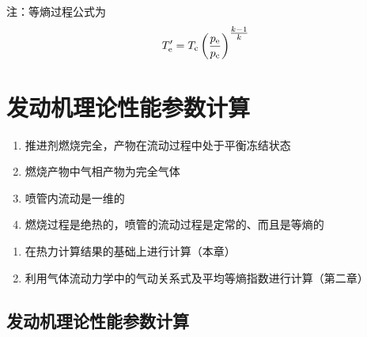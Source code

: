 注：等熵过程公式为
\begin{equation}
	T'_{\rm{e}} = T_{\text{c}} \left(\dfrac{p_{\rm{e}}}{p_{\text{c}}}\right)^{\textstyle \frac{k-1}{k}}
	\label{等熵流动}
\end{equation}

\section{发动机理论性能参数计算}

\sssection[基本假设]\vspace*{-1em}
\begin{enumerate}[\hspace*{1.5em} (1) ]
	\item 推进剂燃烧完全，产物在流动过程中处于平衡冻结状态\vspace*{-0.5em}
	\item 燃烧产物中气相产物为完全气体\vspace*{-0.5em}
	\item 喷管内流动是一维的\vspace*{-0.5em}
	\item 燃烧过程是绝热的，喷管的流动过程是定常的、而且是等熵的
\end{enumerate}

\sssection[两种方法计算理论性能]\vspace*{-1em}
\begin{enumerate}[\hspace*{1.5em} (1) ]
	\item 在热力计算结果的基础上进行计算（本章）\vspace*{-0.5em}
	\item 利用气体流动力学中的气动关系式及平均等熵指数进行计算（第二章）
\end{enumerate}

\subsection{发动机理论性能参数计算}

